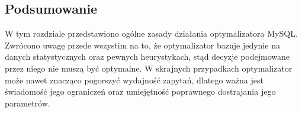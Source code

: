 \subsection{Podsumowanie}
W tym rozdziale przedstawiono ogólne zasady działania optymalizatora MySQL. Zwrócono uwagę przede wszystim na to, że optymalizator bazuje jedynie na danych statystycznych oraz pewnych heurystykach, stąd decyzje podejmowane przez niego nie muszą być optymalne. W skrajnych przypadkach optymalizator może nawet znacząco pogorszyć wydajność zapytań, dlatego ważna jest świadomość jego ograniczeń oraz umiejętność poprawnego dostrajania jego parametrów.

